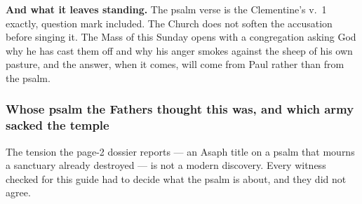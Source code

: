 \textbf{And what it leaves standing.} The psalm verse is the Clementine's
v.~1 exactly, question mark included. The Church does not soften the
accusation before singing it. The Mass of this Sunday opens with a
congregation asking God why he has cast them off and why his anger smokes
against the sheep of his own pasture, and the answer, when it comes, will come
from Paul rather than from the psalm.

\subsubsection*{Whose psalm the Fathers thought this was, and which army sacked
the temple}

The tension the page-2 dossier reports --- an Asaph title on a psalm that
mourns a sanctuary already destroyed --- is not a modern discovery. Every
witness checked for this guide had to decide what the psalm is about, and they
did not agree.

